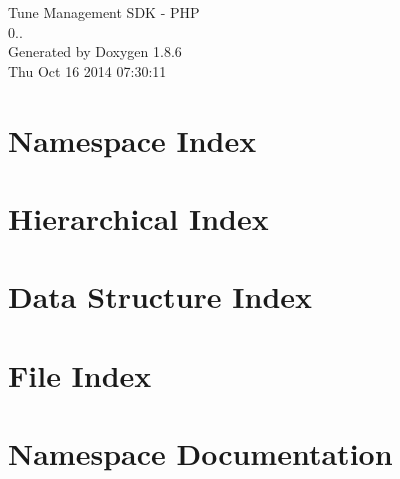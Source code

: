 \documentclass[twoside]{book}
\newcommand{\clearemptydoublepage}{%
  \newpage{\pagestyle{empty}\cleardoublepage}%
}
\begin{document}
\hypersetup{pageanchor=false}
\begin{titlepage}
\vspace*{7cm}
\begin{center}%
{\Large Tune Management S\-D\-K -\/ P\-H\-P \\[1ex]\large 0.. }\\
\vspace*{1cm}
{\large Generated by Doxygen 1.8.6}\\
\vspace*{0.5cm}
{\small Thu Oct 16 2014 07:30:11}\\
\end{center}
\end{titlepage}
\clearemptydoublepage
\tableofcontents
\clearemptydoublepage
{}
\hypersetup{pageanchor=true}

\chapter{Namespace Index}

\chapter{Hierarchical Index}

\chapter{Data Structure Index}

\chapter{File Index}

\chapter{Namespace Documentation}











\end{document}

